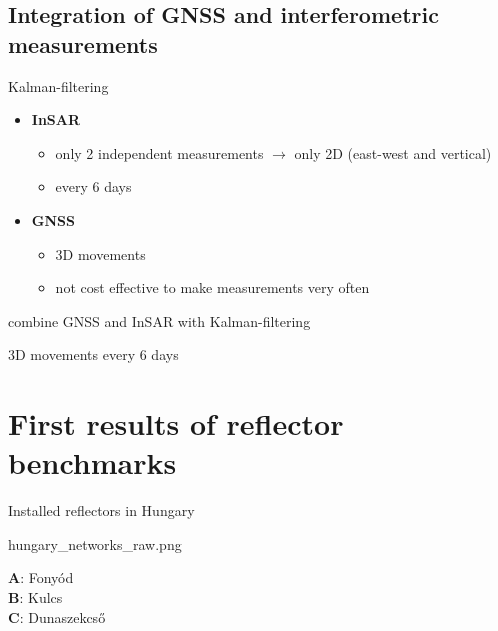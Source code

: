 \documentclass{beamer}
\begin{document}
\subsection{Integration of GNSS and interferometric measurements}


\begin{frame}{Kalman-filtering}
    \begin{itemize}
        \item \textbf{InSAR}
        \begin{itemize}
            \item only 2 independent measurements $\rightarrow$ only 2D (east-west and vertical)
            \item every 6 days
        \end{itemize}
        \item \textbf{GNSS}
        \begin{itemize}
            \item 3D movements
            \item not cost effective to make measurements very often
        \end{itemize}
    \end{itemize}
    \vspace{10pt}
    \begin{center}
        combine GNSS and InSAR with Kalman-filtering
        
        \resizebox{0.1\textwidth}{30pt}{$\Downarrow$}
        \vspace{10pt}
        
        3D movements every 6 days
    \end{center}
\end{frame}


\section{First results of reflector benchmarks}


\begin{frame}{Installed reflectors in Hungary}
    \begin{minipage}[c]{0.7\textwidth}
        \begin{anfig}{hungary_networks_raw.png}
        \end{anfig}
    \end{minipage}
    \hspace{5pt}
    \begin{minipage}[c]{0.25\textwidth}
         \textbf{A}: Fonyód\\
         \textbf{B}: Kulcs\\
         \textbf{C}: Dunaszekcső
    \end{minipage}
\end{frame}
\end{document}
